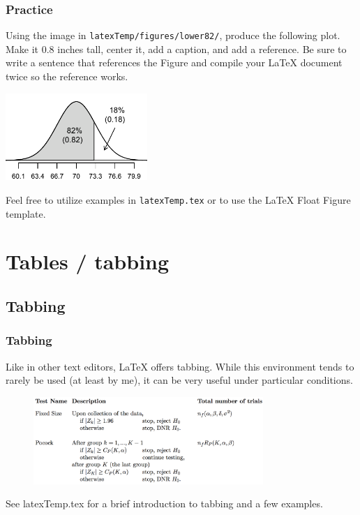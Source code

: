 \documentclass[slidestop,compress,mathserif]{beamer}
\begin{document}
\begin{frame}	\frametitle{Practice}
	
	Using the image in \texttt{\color{highlight}latexTemp/figures/lower82/}, produce the following plot. Make it 0.8 inches tall, center it, add a caption, and add a reference. Be sure to write a sentence that references the Figure and compile your LaTeX document twice so the reference works. \\
	
		\begin{center}
			\includegraphics[height=1.3in]{assignments/latexTemp/figures/lower82/lower82}
		\end{center}
		
	Feel free to utilize examples in \texttt{\color{highlight}latexTemp.tex} or to use the LaTeX Float Figure template.
		
\end{frame}


\section[Tables / tabbing]{Tables / tabbing}

\subsection[Tabbing]{Tabbing}
\begin{frame} \frametitle{Tabbing}
	Like in other text editors, LaTeX offers tabbing. While this environment tends to rarely be used (at least by me), it can be very useful under particular conditions.
	\begin{figure}[htbp]
		\centering
		\includegraphics[height=1.3in]{basicsOfLatex/tabTable/tabbingExample}
	\end{figure}
	See {\color{highlight}latexTemp.tex} for a brief introduction to tabbing and a few examples.
\end{frame}
\end{document}
